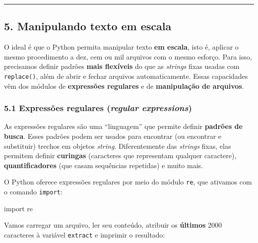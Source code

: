 \documentclass[
  brazilian,
  11pt,
]{article}
\newenvironment{Shaded}{\begin{snugshade}}{\end{snugshade}}
\newcommand{\ImportTok}[1]{\textcolor[rgb]{0.15,0.68,0.38}{#1}}
\newcommand{\NormalTok}[1]{\textcolor[rgb]{0.81,0.81,0.76}{#1}}
\let\oldtexttt\texttt
\renewcommand{\texttt}[1]{{\color{inlink}\oldtexttt{#1}}}
\begin{document}
\begin{center}\rule{0.5\linewidth}{0.5pt}\end{center}

\subsection{5. Manipulando texto em
escala}\label{manipulando-texto-em-escala}

O ideal é que o Python permita manipular texto \textbf{em escala}, isto
é, aplicar o mesmo procedimento a dez, cem ou mil arquivos com o mesmo
esforço. Para isso, precisamos definir padrões \textbf{mais flexíveis}
do que as \emph{strings} fixas usadas com \texttt{replace()}, além de
abrir e fechar arquivos automaticamente. Essas capacidades vêm dos
módulos de \textbf{expressões regulares} e de \textbf{manipulação de
arquivos}.

\subsubsection{\texorpdfstring{5.1 Expressões regulares (\emph{regular
expressions})}{5.1 Expressões regulares (regular expressions)}}\label{expressuxf5es-regulares-regular-expressions}

As expressões regulares são uma ``linguagem'' que permite definir
\textbf{padrões de busca}. Esses padrões podem ser usados para encontrar
(ou encontrar e substituir) trechos em objetos \emph{string}.
Diferentemente das \emph{strings} fixas, elas permitem definir
\textbf{curingas} (caracteres que representam qualquer caractere),
\textbf{quantificadores} (que casam sequências repetidas) e muito mais.

O Python oferece expressões regulares por meio do módulo \texttt{re},
que ativamos com o comando \texttt{import}:

\begin{Shaded}
\begin{Highlighting}[]
\ImportTok{import}\NormalTok{ re}
\end{Highlighting}
\end{Shaded}

Vamos carregar um arquivo, ler seu conteúdo, atribuir os
\textbf{últimos} 2000 caracteres à variável \texttt{extract} e imprimir
o resultado:
\end{document}
